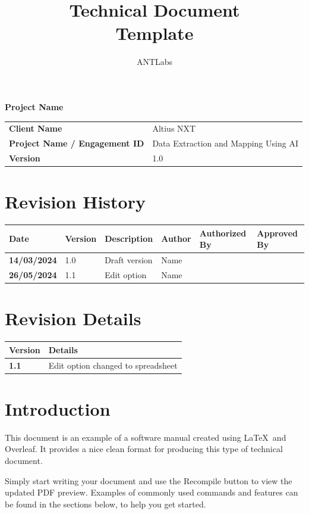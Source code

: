 \documentclass{ol-softwaremanual}
\title{Technical Document \\Template}
\author{ANTLabs}
\begin{document}
\maketitle
{ \centering  
    {\huge \bfseries Project Name \par}
    \vspace{2cm}
    
    \begin{tabular}{>{\bfseries}l l}
    Client Name & Altius NXT \\
    Project Name / Engagement ID & Data Extraction and Mapping Using AI \\
    Version & 1.0 \\
    \end{tabular}
}  
    \vfill
\section*{Revision History}
\noindent
\begin{tabular}{|>{\bfseries}l|l|l|l|l|l|}
    \hline
    Date & Version & Description & Author & Authorized By & Approved By \\
    \hline
    14/03/2024 & 1.0 & Draft version & Name & & \\
    \hline
    26/05/2024 & 1.1 & Edit option & Name & & \\
    \hline
\end{tabular}
    \vfill
    
 \section*{Revision Details}
\begin{tabular}{>{\bfseries}l l}
    Version & Details \\
    \midrule
    1.1 & Edit option changed to spreadsheet \\
    \end{tabular}
 
    \vfill
\newpage

\tableofcontents
\listoflistings
\newpage

\section{Introduction}

This document is an example of a software manual created using \LaTeX\ and Overleaf. It provides a nice clean format for producing this type of technical document. 

Simply start writing your document and use the Recompile button to view the updated PDF preview. Examples of commonly used commands and features can be found in the sections below, to help you get started.
\end{document}
